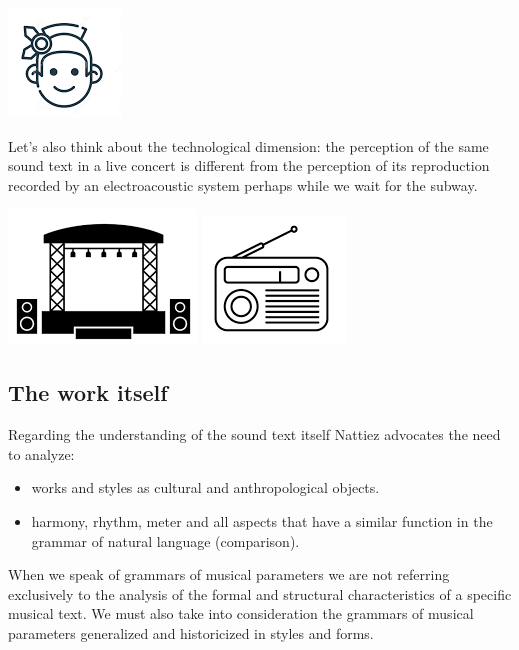 \begin{center}
\includegraphics[scale=0.6]{../img/indigeni.png}
\end{center}

Let's also think about the technological dimension: the perception of the same sound text in a live concert is different from the perception of its reproduction recorded by an electroacoustic system perhaps while we wait for the subway.

\begin{center}
\includegraphics[scale=0.5]{../img/acousma.png}
\includegraphics[scale=0.5]{../img/sony.png}
\end{center}

\subsection{The work itself}\label{the-work-itself}

Regarding the understanding of the sound text itself Nattiez advocates the need to analyze: 
\begin{itemize}
\item works and styles as cultural and anthropological objects. 
\item harmony, rhythm, meter and all aspects that have a similar function in the grammar of natural language (comparison).
\end{itemize}

When we speak of grammars of musical parameters we are not referring exclusively to the analysis of the formal and structural characteristics of a specific musical text. We must also take into consideration the grammars of musical parameters generalized and historicized in styles and forms.

